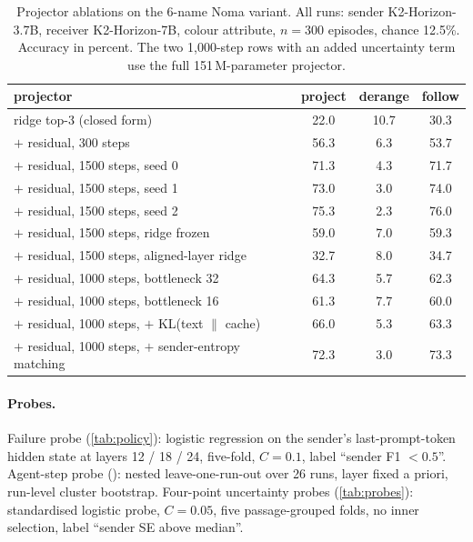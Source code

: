 \documentclass[11pt,a4paper]{report}
\begin{document}
\begin{table}[h]
\caption{Projector ablations on the 6-name Noma variant. All runs: sender K2-Horizon-3.7B, receiver K2-Horizon-7B, colour attribute, $n = 300$ episodes, chance 12.5\%. Accuracy in percent. The two 1,000-step rows with an added uncertainty term use the full 151\,M-parameter projector.}
\label{tab:ablations}
\vskip 0.1in
\begin{center}
\begin{small}
\begin{tabular}{lccc}
\toprule
projector & project & derange & follow \\
\midrule
ridge top-3 (closed form)                     & 22.0 & 10.7 & 30.3 \\
$+$ residual, 300 steps                       & 56.3 & 6.3  & 53.7 \\
$+$ residual, 1500 steps, seed 0              & 71.3 & 4.3  & 71.7 \\
$+$ residual, 1500 steps, seed 1              & 73.0 & 3.0  & 74.0 \\
$+$ residual, 1500 steps, seed 2              & 75.3 & 2.3  & 76.0 \\
$+$ residual, 1500 steps, ridge frozen        & 59.0 & 7.0  & 59.3 \\
$+$ residual, 1500 steps, aligned-layer ridge & 32.7 & 8.0  & 34.7 \\
$+$ residual, 1000 steps, bottleneck 32       & 64.3 & 5.7  & 62.3 \\
$+$ residual, 1000 steps, bottleneck 16       & 61.3 & 7.7  & 60.0 \\
$+$ residual, 1000 steps, $+$ KL(text $\|$ cache) & 66.0 & 5.3 & 63.3 \\
$+$ residual, 1000 steps, $+$ sender-entropy matching & 72.3 & 3.0 & 73.3 \\
\bottomrule
\end{tabular}
\end{small}
\end{center}
\end{table}

\paragraph{Probes.} Failure probe (\cref{tab:policy}): logistic regression on the sender's last-prompt-token hidden state at layers 12 / 18 / 24, five-fold, $C = 0.1$, label ``sender F1 $< 0.5$''. Agent-step probe (): nested leave-one-run-out over 26 runs, layer fixed a priori, run-level cluster bootstrap. Four-point uncertainty probes (\cref{tab:probes}): standardised logistic probe, $C = 0.05$, five passage-grouped folds, no inner selection, label ``sender SE above median''.
\end{document}
